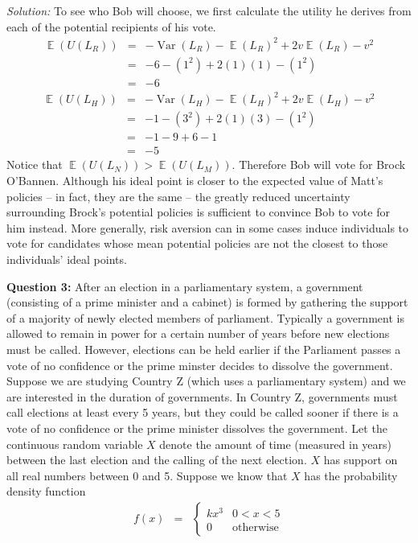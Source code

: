 \documentclass[11pt]{article}
\DeclareMathOperator*{\E}{\mathbb{E}}
\DeclareMathOperator*{\V}{Var}
\begin{document}
\begin{enumerate}
{\it Solution:} To see who Bob will choose, we first calculate the utility he derives from each of the potential recipients of his vote. 
\begin{eqnarray*}
\E(U(L_R))&=&  -\V(L_R) - \E(L_R)^2 + 2v\E(L_R)-v^2 \\
&=& -6 - (1^2) + 2(1)(1) - (1^2) \\
&=& -6
\end{eqnarray*}
\begin{eqnarray*}
\E(U(L_H))&=&  -\V(L_H) - \E(L_H)^2 + 2v\E(L_H)-v^2 \\
&=& -1 - (3^2) + 2(1)(3) - (1^2) \\
&=& -1 - 9 + 6 -1 \\
&=& -5
\end{eqnarray*}
Notice that $\E(U(L_N)) > \E(U(L_M))$. Therefore Bob will vote for Brock O'Bannen. Although his ideal point is closer to the expected value of Matt's policies -- in fact, they are the same -- the greatly reduced uncertainty surrounding Brock's potential policies is sufficient to convince Bob to vote for him instead. More generally, risk aversion can in some cases induce individuals to vote for candidates whose mean potential policies are not the closest to those individuals' ideal points.
\end{enumerate}

\bigskip

\noindent \textbf{Question 3:} After an election in a parliamentary system, a government (consisting of a prime minister and a cabinet) is formed by gathering the support of a majority of newly elected members of parliament. Typically a government is allowed to remain in power for a certain number of years before new elections must be called. However, elections can be held earlier if the Parliament passes a vote of no confidence or the prime minster decides to dissolve the government. Suppose we are studying Country Z (which uses a parliamentary system) and we are interested in the duration of governments. In Country Z, governments must call elections at least every 5 years, but they could be called sooner if there is a vote of no confidence or the prime minister dissolves the government. Let the continuous random variable $X$ denote the amount of time (measured in years) between the last election and the calling of the next election. $X$ has support on all real numbers between 0 and 5. Suppose we know that $X$ has the probability density function
\begin{eqnarray*}
f(x) &=& \begin{cases}
kx^3 &  0 < x < 5 \\
0 & \text{otherwise}
\end{cases}
\end{eqnarray*}
\end{document}
